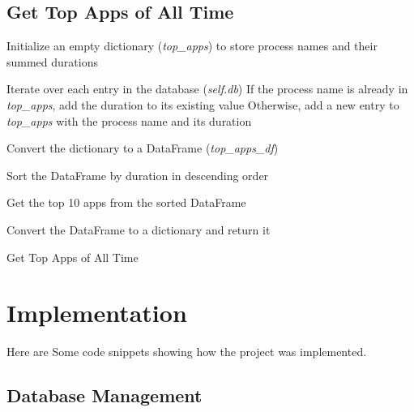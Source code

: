 \documentclass[openany]{report}
\begin{document}
\subsection{Get Top Apps of All Time}

\begin{algorithm}[H]
    \SetAlgoLined
    \BlankLine

    Initialize an empty dictionary (\textit{top\_apps}) to store process names and their summed durations\;

    Iterate over each entry in the database (\textit{self.db})\;
    \Indp
    If the process name is already in \textit{top\_apps}, add the duration to its existing value\;
    Otherwise, add a new entry to \textit{top\_apps} with the process name and its duration\;
    \Indm

    Convert the dictionary to a DataFrame (\textit{top\_apps\_df})\;

    Sort the DataFrame by duration in descending order\;

    Get the top 10 apps from the sorted DataFrame\;

    Convert the DataFrame to a dictionary and return it\;
    \BlankLine

    \caption{Get Top Apps of All Time}
\end{algorithm}


\section{Implementation}
Here are Some code snippets showing how the project was implemented.\\

\subsection{Database Management}
\end{document}
